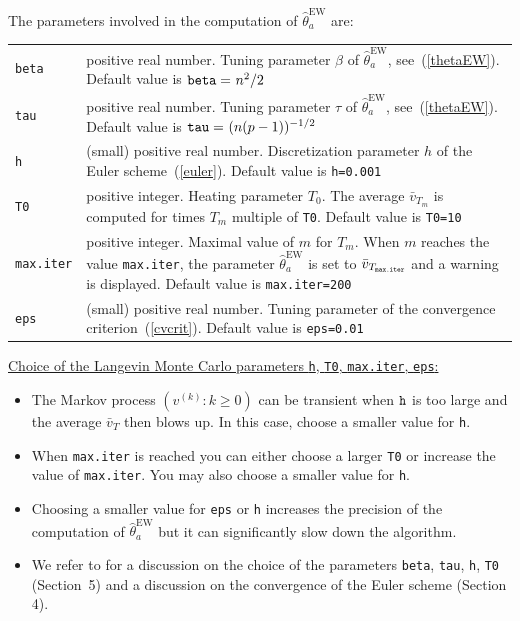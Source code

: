 \documentclass[noinfoline]{imsart}
\newcommand{\EW}{\mathrm{EW}}
\begin{document}
The parameters involved in the computation of $\hat\theta_{a}^{\EW}$ are:\smallskip

\begin{tabular}{lp{13cm}}
{\tt beta} & positive real number. Tuning parameter $\beta$ of $\hat\theta_{a}^{\EW}$, see~(\ref{thetaEW}). Default value is ${\tt beta=}\ n^2/2$ \\
{\tt tau} & positive real number. Tuning parameter $\tau$ of $\hat\theta_{a}^{\EW}$, see~(\ref{thetaEW}). Default value is ${\tt tau=}\ (n(p-1))^{-1/2}$\\
{\tt h} & (small) positive real number. Discretization parameter $h$ of the Euler scheme~(\ref{euler}). Default value is {\tt h=0.001}\\
{\tt T0} & positive integer. Heating parameter $T_{0}$. The average $\bar v_{T_{m}}$ is computed for times $T_{m}$ multiple of {\tt T0}. Default value is {\tt T0=10}\\
{\tt max.iter} & positive integer. Maximal value of $m$ for $T_{m}$. When $m$ reaches the value {\tt max.iter}, the parameter   $\hat\theta_{a}^{\EW}$ is set to $\bar v_{T_{{\tt max.iter}}}$ and a warning is displayed. Default value is {\tt max.iter=200}\\
{\tt eps} & (small) positive real number. Tuning parameter of the convergence criterion~(\ref{cvcrit}). Default value is {\tt eps=0.01}
\end{tabular}
\smallskip

\underline{Choice of the Langevin Monte Carlo parameters {\tt h}, {\tt T0}, {\tt max.iter}, {\tt eps}:}

\begin{itemize}
\item The Markov process $(v^{(k)}:k\geq 0)$ can be transient when ${\tt h}$ is too large and the average $\bar v_{T}$ then blows up. In this case, choose a smaller value for {\tt h}. 
\item When {\tt max.iter} is reached you can either choose a larger {\tt T0} or increase the value of {\tt max.iter}. You may also choose a smaller value for {\tt h}. 
\item Choosing a smaller value for {\tt eps} or {\tt h}  increases the precision of the computation of $\hat\theta_{a}^{\EW}$  but it can significantly slow down the algorithm.
\item We refer to \cite{DT09}  for a discussion on the choice of the parameters {\tt beta}, {\tt tau}, {\tt h}, {\tt T0}   (Section~5) and  a discussion on the convergence of the Euler scheme (Section 4).
\end{itemize}
\end{document}
